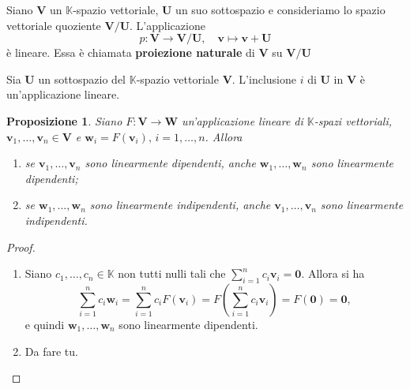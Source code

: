 \documentclass{article}
\theoremstyle{plain}
\newtheorem{prop}[thm]{Proposizione}
\theoremstyle{definition}
\theoremstyle{remark}
\begin{document}
\vspace{10pt}

Siano $\mathbf{V}$ un $\mathbb{K}$-spazio vettoriale, $\mathbf{U}$ un suo sottospazio e consideriamo lo spazio vettoriale quoziente $\mathbf{V/U}$. 
L'applicazione 
\[p:\mathbf{V}\to\mathbf{V/U},\quad \mathbf{v}\mapsto \mathbf{v}+\mathbf{U}\]
è lineare. Essa è chiamata \textbf{proiezione naturale} di $\mathbf{V}$ su $\mathbf{V/U}$

\vspace{10pt}

Sia $\mathbf{U}$ un sottospazio del $\mathbb{K}$-spazio vettoriale $\mathbf{V}$. L'inclusione $i$ di $\mathbf{U}$ in $\mathbf{V}$ è un'applicazione lineare.

\vspace{10pt}

\begin{bxthm}
\begin{prop}
    Siano $F:\mathbf{V}\to\mathbf{W}$ un'applicazione lineare di $\mathbb{K}$-spazi vettoriali, $\mathbf{v}_1,\ldots,\mathbf{v}_n\in\mathbf{V}$ e $\mathbf{w}_i=F(\mathbf{v}_i),\,i=1,\ldots,n$. Allora
    \begin{enumerate}
        \item se $\mathbf{v}_1,\ldots,\mathbf{v}_n$ sono linearmente dipendenti, anche $\mathbf{w}_1,\ldots,\mathbf{w}_n$ sono linearmente dipendenti;
        \item se $\mathbf{w}_1,\ldots,\mathbf{w}_n$ sono linearmente indipendenti, anche $\mathbf{v}_1,\ldots,\mathbf{v}_n$ sono linearmente indipendenti.
    \end{enumerate}
\end{prop}
\end{bxthm}
\begin{proof}\hfill 
    \begin{enumerate}
        \item Siano $c_1,\ldots,c_n\in\mathbb{K}$ non tutti nulli tali che $\sum\limits_{i=1}^{n}c_i\mathbf{v}_i=\mathbf{0}$.
        Allora si ha \[\sum_{i=1}^{n}c_i\mathbf{w}_i=\sum_{i=1}^{n}c_iF(\mathbf{v}_i)=F\left(\sum_{i=1}^{n}c_i\mathbf{v}_i\right)=F(\mathbf{0})=\mathbf{0},\]
        e quindi $\mathbf{w}_1,\ldots,\mathbf{w}_n$ sono linearmente dipendenti.
        \item Da fare tu.
    \end{enumerate}
\end{proof}

\vspace{10pt}
\end{document}
